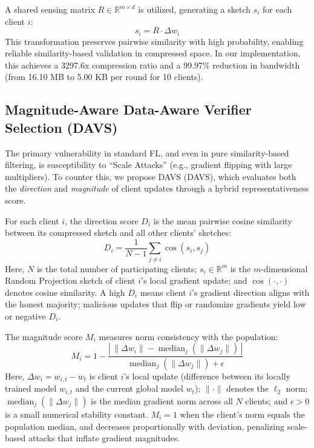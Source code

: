 \documentclass[conference]{IEEEtran}
\begin{document}
A shared sensing matrix $R \in \mathbb{R}^{m \times d}$ is utilized, generating a sketch $s_i$ for each client $i$:
\begin{equation}
    s_i = R \cdot \Delta w_i
\end{equation}
This transformation preserves pairwise similarity with high probability, enabling reliable similarity-based validation in compressed space. In our implementation, this achieves a 3297.6x compression ratio and a 99.97\% reduction in bandwidth (from 16.10 MB to 5.00 KB per round for 10 clients).

\subsection{Magnitude-Aware Data-Aware Verifier Selection (DAVS)}
The primary vulnerability in standard FL, and even in pure similarity-based filtering, is susceptibility to ``Scale Attacks'' (e.g., gradient flipping with large multipliers). To counter this, we propose DAVS (DAVS), which evaluates both the \textit{direction} and \textit{magnitude} of client updates through a hybrid representativeness score.

For each client $i$, the direction score $D_i$ is the mean pairwise cosine similarity between its compressed sketch and all other clients' sketches:
\begin{equation}
    D_i = \frac{1}{N-1} \sum_{j \neq i} \cos(s_i, s_j)
\end{equation}
Here, $N$ is the total number of participating clients; $s_i \in \mathbb{R}^m$ is the $m$-dimensional Random Projection sketch of client $i$'s local gradient update; and $\cos(\cdot,\cdot)$ denotes cosine similarity. A high $D_i$ means client $i$'s gradient direction aligns with the honest majority; malicious updates that flip or randomize gradients yield low or negative $D_i$.

The magnitude score $M_i$ measures norm consistency with the population:
\begin{equation}
    M_i = 1 - \frac{|\,\|\Delta w_i\| - \operatorname{median}_j(\|\Delta w_j\|)\,|}{\operatorname{median}_j(\|\Delta w_j\|) + \epsilon}
\end{equation}
Here, $\Delta w_i = w_{i,t} - w_t$ is client $i$'s local update (difference between its locally trained model $w_{i,t}$ and the current global model $w_t$); $\|\cdot\|$ denotes the $\ell_2$ norm; $\operatorname{median}_j(\|\Delta w_j\|)$ is the median gradient norm across all $N$ clients; and $\epsilon > 0$ is a small numerical stability constant. $M_i = 1$ when the client's norm equals the population median, and decreases proportionally with deviation, penalizing scale-based attacks that inflate gradient magnitudes.
\end{document}
